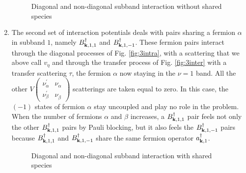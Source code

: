 \documentclass[11pt]{article} %
\begin{document}
\begin{enumerate}
\begin{figure}[hhtb]
	\caption{Diagonal and non-diagonal subband interaction without shared species}
\end{figure}
\item The second set of interaction potentials deals with pairs sharing a fermion $\alpha$ in subband $1$, namely $B^{\dagger}_{\mathbf{k},1,1}$ and $B^{\dagger}_{\mathbf{k},1,-1}$. These fermion pairs interact through the diagonal processes of Fig. \ref{fig:3intra}, with a scattering that we above call $v_{\eta}$ and through the transfer process of Fig. \ref{fig:3inter} with a transfer scattering $\tau$, the fermion $\alpha$ now staying in the $\nu=1$ band.  All the other $V 
\left(\begin{smallmatrix}\nu_{\alpha}^{{\prime}}&\nu_{\alpha}^{}\\ \nu_{\beta}^{{\prime}}&\nu_{\beta}^{}\end{smallmatrix}\right)$ scatterings are taken equal to zero.  In this case, the $(-1)$ states of fermion $\alpha$ stay uncoupled and play no role in the problem.  When the number of fermions $\alpha$ and $\beta$ increases, a $B^{\dagger}_{\mathbf{k},1,1}$ pair feels not only the other $B^{\dagger}_{\mathbf{k},1,1}$ pairs by Pauli blocking, but it also feels the $B^{\dagger}_{\mathbf{k},1,-1}$ pairs because $B^{\dagger}_{\mathbf{k},1,1}$ and $B^{\dagger}_{\mathbf{k},1,-1}$ share the same fermion operator $a^{\dagger}_{\mathbf{k},1}$.
\begin{figure}[hhtb]
	\centering
	         \qquad
	\caption{Diagonal and non-diagonal subband interaction with shared species}
\end{figure}
\end{enumerate}
\end{document}
